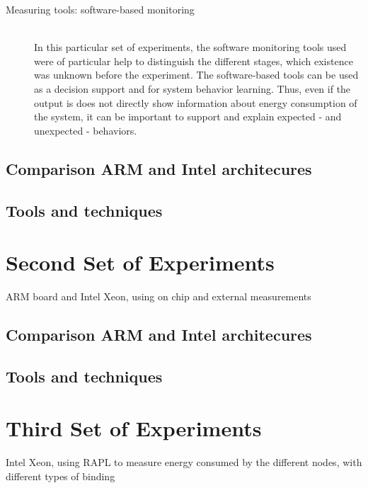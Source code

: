 \begin{description}
\item[Measuring tools: software-based monitoring] \hfill \\
In this particular set of experiments, the software monitoring tools used were
of particular help to distinguish the different stages, which existence was
unknown before the experiment. The software-based tools can be used as a 
decision support and for system behavior learning. Thus, even if the output is
does not directly show information about energy consumption of the system, it
can be important to support and explain expected - and unexpected - behaviors.
  


\end{description}


\subsection{Comparison ARM and Intel architecures}
\subsection{Tools and techniques}

\section{Second Set of Experiments}
ARM board and Intel Xeon, using on chip and external measurements

\subsection{Comparison ARM and Intel architecures}
\subsection{Tools and techniques}


\section{Third Set of Experiments}
Intel Xeon, using RAPL to measure energy consumed by the different nodes, with
different types of binding
